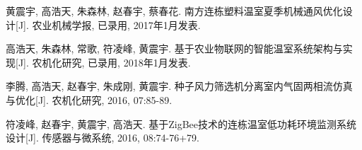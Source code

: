
\begin{publications}{99}
    \item\textsc{黄震宇, 高浩天, 朱森林, 赵春宇, 蔡春花}. {南方连栋塑料温室夏季机械通风优化设计}[J]. 农业机械学报, 已录用, 2017年1月发表.
    \item\textsc{高浩天, 朱森林, 常歌, 符凌峰, 黄震宇}. {基于农业物联网的智能温室系统架构与实现}[J]. 农机化研究, 已录用, 2018年1月发表.
    \item\textsc{李腾, 高浩天, 赵春宇, 朱成刚, 黄震宇}. {种子风力筛选机分离室内气固两相流仿真与优化}[J]. 农机化研究, 2016, 07:85-89.
    \item\textsc{符凌峰, 赵春宇, 黄震宇, 高浩天}. {基于ZigBee技术的连栋温室低功耗环境监测系统设计}[J]. 传感器与微系统, 2016, 08:74-76+79.
\end{publications}
